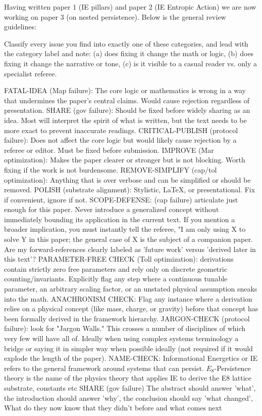 Having written paper 1 (IE pillars) and paper 2 (IE Entropic Action) we are now working on paper 3 (on nested persistence).  Below is the general review guidelines:

Classify every issue you find into exactly one of these categories, and lead with the category label and note: (a) does fixing it change the math or logic, (b) does fixing it change the narrative or tone, (c) is it visible to a casual reader vs. only a specialist referee.

FATAL-IDEA (Map failure): The core logic or mathematics is wrong in a way that undermines the paper's central claims. Would cause rejection regardless of presentation.
SHARE (gov failure): Should be fixed before widely sharing as an idea.  Most will interpret the spirit of what is written, but the text needs to be more exact to prevent inaccurate readings.
CRITICAL-PUBLISH (protocol failure): Does not affect the core logic but would likely cause rejection by a referee or editor. Must be fixed before submission.
IMPROVE (Mar optimization): Makes the paper clearer or stronger but is not blocking. Worth fixing if the work is not burdensome.
REMOVE-SIMPLIFY (cap/tol optimization): Anything that is over verbose and can be simplified or should be removed.
POLISH (substrate alignment): Stylistic, LaTeX, or presentational. Fix if convenient, ignore if not.
SCOPE-DEFENSE: (cap failure) articulate just enough for this paper.  Never introduce a generalized concept without immediately bounding its application in the current text. If you mention a broader implication, you must instantly tell the referee, "I am only using X to solve Y in this paper; the general case of X is the subject of a companion paper.  Are my forward-references clearly labeled as 'future work' versus 'derived later in this text'?
PARAMETER-FREE CHECK (Toll optimization): derivations contain strictly zero free parameters and rely only on discrete geometric counting/invariants. Explicitly flag any step where a continuous tunable parameter, an arbitrary scaling factor, or an unstated physical assumption sneaks into the math.
ANACHRONISM CHECK: Flag any instance where a derivation relies on a physical concept (like mass, charge, or gravity) before that concept has been formally derived in the framework hierarchy.
JARGON-CHECK (protocol failure): look for "Jargon Walls." This crosses a number of disciplines of which very few will have all of.  Ideally when using complex systems terminology a bridge or saying it in simpler way when possible ideally (not required if it would explode the length of the paper).
NAME-CHECK: Informational Energetics or IE refers to the general framework around systems that can persist.  $E_8$-Persistence theory is the name of the physics theory that applies IE to derive the E8 lattice substrate, constants etc
SHARE (gov failure) The abstract should answer 'what', the introduction should answer 'why', the conclusion should say 'what changed', What do they now know that they didn't before and what comes next 



